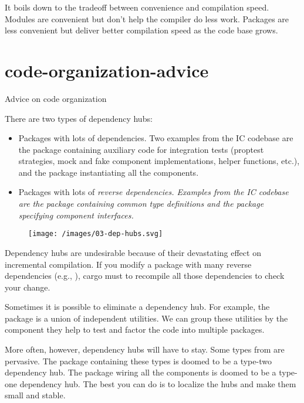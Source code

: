 \documentclass{article}
\begin{document}
It boils down to the tradeoff between convenience and compilation speed.
Modules are convenient but don't help the compiler do less work.
Packages are less convenient but deliver better compilation speed as the code base grows.

\section{code-organization-advice}{Advice on code organization}


There are two types of dependency hubs:
\begin{itemize}
\item 
  Packages with lots of dependencies.
  Two examples from the IC codebase are the  package containing auxiliary code for integration tests
  (proptest strategies, mock and fake component implementations, helper functions, etc.),
  and the  package instantiating all the components.
\item 
  Packages with lots of \em{reverse dependencies}.
  Examples from the IC codebase are the  package containing common type definitions and the  package specifying component interfaces.
\end{itemize}

\begin{figure}[grayscale-diagram]
  \texttt{[image: /images/03-dep-hubs.svg]}
\end{figure}

Dependency hubs are undesirable because of their devastating effect on incremental compilation.
If you modify a package with many reverse dependencies (e.g., ), cargo must to recompile all those dependencies to check your change.

Sometimes it is possible to eliminate a dependency hub.
For example, the  package is a union of independent utilities.
We can group these utilities by the component they help to test and factor the code into multiple  packages.

More often, however, dependency hubs will have to stay.
Some types from  are pervasive.
The package containing these types is doomed to be a type-two dependency hub.
The  package wiring all the components is doomed to be a type-one dependency hub.
The best you can do is to localize the hubs and make them small and stable.
\end{document}
